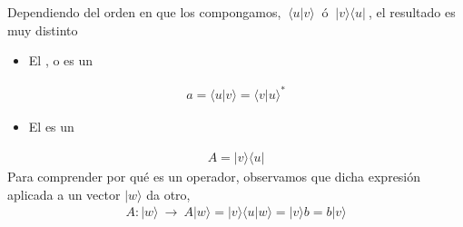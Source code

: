 \documentclass[letterpaper,10pt,english]{jupyterBook}
\newcommand{\ket}[1]{|#1\rangle}
\newcommand{\braket}[2]{\langle #1|#2\rangle}
\newcommand{\ketbra}[2]{| #1\rangle \langle #2 |}
\begin{document}
\sphinxAtStartPar
Dependiendo del orden en que los compongamos, \(~\braket{u}{v}~\) ó \(~\ketbra{v}{u}~\), el resultado es  muy distinto
\begin{itemize}
\item {} 
\sphinxAtStartPar
El , o  es un 

\end{itemize}
\begin{equation*}
\begin{split}
 a = \braket{u}{v} = \braket{v}{u}^* 
\end{split}
\end{equation*}\begin{itemize}
\item {} 
\sphinxAtStartPar
El   es un 

\end{itemize}
\begin{equation*}
\begin{split}
A = \ketbra{v}{u}
\end{split}
\end{equation*}
\sphinxAtStartPar
Para comprender por qué es un operador, observamos que dicha expresión aplicada a un vector \(\ket{w}\) da otro,
\begin{equation*}
\begin{split}
A : \ket{w} ~\to ~ A\ket{w} =  \ket{v}\braket{u}{w}=\ket{v} b  = b \ket{v} 
\end{split}
\end{equation*}
\end{document}
